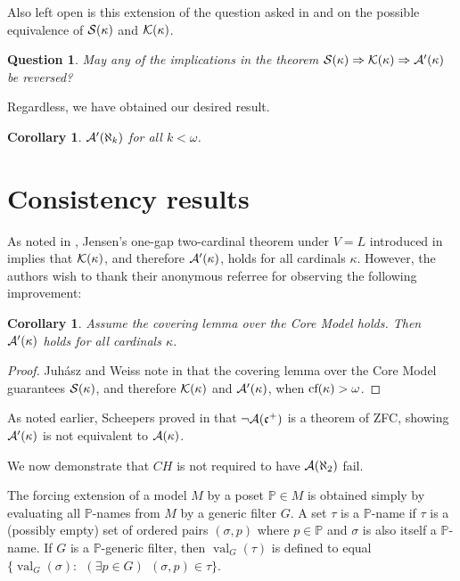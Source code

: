 \documentclass{rmmcart}
\theoremstyle{plain}
\newtheorem{corollary}[theorem]{Corollary}
\newtheorem{question}[theorem]{Question}
\theoremstyle{definition}
\theoremstyle{remark}
\theoremstyle{plain}
\theoremstyle{definition}
\theoremstyle{remark}
\def\val{\operatorname{val}}
\begin{document}
  Also left open is this extension of the question asked in \cite{NYIKOSKUREPA}
  and \cite{MR539228} on the possible equivalence of \(\mathcal{S}(\kappa)\)
  and \(\mathcal{K}(\kappa)\).

  \begin{question}
    May any of the implications in the theorem
    \(\mathcal{S}(\kappa)\Rightarrow\mathcal{K}(\kappa)\Rightarrow\mathcal{A}'(\kappa)\)
    be reversed?
  \end{question}

  Regardless, we have obtained our desired result.

  \begin{corollary}
    \(\mathcal{A}'(\aleph_k)\) for all \(k<\omega\).
  \end{corollary}




  \section{Consistency results}

  As noted in \cite{MR1229125}, Jensen's one-gap two-cardinal theorem under
  \(V=L\) introduced in \cite{MR0309729} implies that \(\mathcal{K}(\kappa)\),
  and therefore \(\mathcal{A}'(\kappa)\), holds for all cardinals \(\kappa\).
  However, the authors wish to thank their anonymous referree for
  observing the following improvement:

  \begin{corollary}\label{alcompSPunderV=L}
    Assume the covering lemma over the Core Model holds. Then
    \(\mathcal{A}'(\kappa)\) holds for all cardinals \(\kappa\).
  \end{corollary}

  \begin{proof}
    Juh\'asz and Weiss note in \cite[pg. 186]{juhaszgood} that the covering
    lemma over the Core Model guarantees \(\mathcal{S}(\kappa)\), and therefore
    \(\mathcal{K}(\kappa)\) and \(\mathcal{A}'(\kappa)\), when
    \(\textrm{cf}(\kappa)>\omega\).
  \end{proof}

  As noted earlier, Scheepers proved in \cite{MR1129143}
  that \(\neg\mathcal{A}(\mathfrak{c}^+)\) is a theorem of ZFC, showing
  \(\mathcal{A}'(\kappa)\) is not equivalent to \(\mathcal{A}(\kappa)\).

  We now demonstrate that \(CH\) is not required to have \(\mathcal{A}(\aleph_2)\)
  fail.



            The forcing extension of a model $M$ by a poset $\mathbb P\in M$ is
            obtained simply by evaluating all $\mathbb P$-names from $M$ by a
            generic filter $G$.
             A set $\tau$ is a $\mathbb P$-name if $\tau$ is a
             (possibly empty)
            set of ordered pairs $(\sigma,p)$ where $p\in \mathbb P$ and
             $\sigma$ is also itself a $\mathbb P$-name.
            If $G$ is a $\mathbb P$-generic filter, then
             $\val_G(\tau) $ is defined to equal
              $\{ \val_G(\sigma) : ~~(\exists p\in G)~~(\sigma,p)\in \tau\}$.
\end{document}
